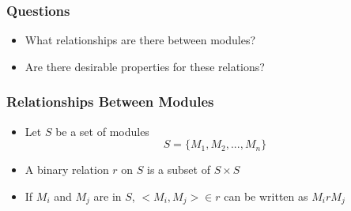 \documentclass[t,12pt,numbers,fleqn]{beamer}
\begin{document}



\begin{frame}
\frametitle{Questions}

\begin{itemize}
\item What relationships are there between modules?
\item Are there desirable properties for these relations?
\end{itemize}

\end{frame}


\begin{frame}
\frametitle{Relationships Between Modules \cite{GhezziEtAl2003}}

\begin{itemize}
\item Let $S$ be a set of modules
$$ S = \{ M_1, M_2, ..., M_n \}$$
\item A binary relation $r$ on $S$ is a subset of $S \times S$
\item If $M_i$ and $M_j$ are in $S$, $< M_i, M_j > \in r$ can be written as $M_i r M_j$
\end{itemize} 

\end{frame}
\end{document}
